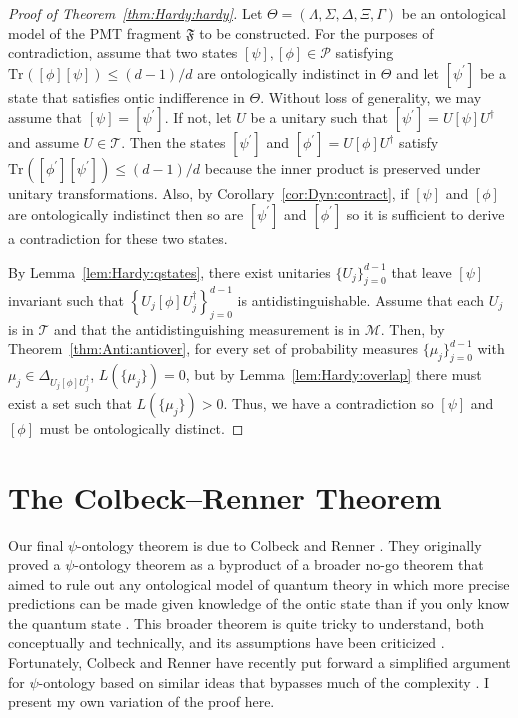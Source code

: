 \documentclass[DIV=calc,fontsize=12pt]{scrartcl} %
\theoremstyle{definition}
\theoremstyle{plain}
\newcommand{\Proj}[1]{\ensuremath{\left [ #1 \right ]}}
\newcommand{\Tr}[2][]{\ensuremath{\text{Tr}_{#1} \left ( #2 \right )}}
\begin{document}
\begin{proof}[Proof of Theorem~\ref{thm:Hardy:hardy}]
Let $\Theta = (\Lambda, \Sigma, \Delta, \Xi, \Gamma)$ be an ontological
model of the PMT fragment $\mathfrak{F}$ to be constructed.  For the
purposes of contradiction, assume that two states $\Proj{\psi},
\Proj{\phi} \in \mathcal{P}$ satisfying $\Tr{\Proj{\phi}\Proj{\psi}}
\leq (d-1)/d$ are ontologically indistinct in $\Theta$ and let
$\Proj{\psi^{\prime}}$ be a state that satisfies ontic indifference
in $\Theta$.  Without loss of generality, we may assume that
$\Proj{\psi} = \Proj{\psi^{\prime}}$.  If not, let $U$ be a unitary
such that $\Proj{\psi^{\prime}} = U \Proj{\psi} U^{\dagger}$ and
assume $U \in \mathcal{T}$.  Then the states $\Proj{\psi^{\prime}}$
and $\Proj{\phi^{\prime}} = U \Proj{\phi} U^{\dagger}$ satisfy
$\Tr{\Proj{\phi^{\prime}}\Proj{\psi^{\prime}}} \leq (d-1)/d$ because
the inner product is preserved under unitary transformations.  Also,
by Corollary~\ref{cor:Dyn:contract}, if $\Proj{\psi}$ and
$\Proj{\phi}$ are ontologically indistinct then so are
$\Proj{\psi^{\prime}}$ and $\Proj{\phi^{\prime}}$ so it is
sufficient to derive a contradiction for these two states.

By Lemma~\ref{lem:Hardy:qstates}, there exist unitaries
$\{U_j\}_{j=0}^{d-1}$ that leave $\Proj{\psi}$ invariant such that
$\left \{ U_j \Proj{\phi}U_j^{\dagger} \right \}_{j=0}^{d-1}$ is
antidistinguishable.  Assume that each $U_j$ is in $\mathcal{T}$ and
that the antidistinguishing measurement is in $\mathcal{M}$.  Then,
by Theorem~\ref{thm:Anti:antiover}, for every set of probability
measures $\{\mu_j\}_{j=0}^{d-1}$ with $\mu_j \in \Delta_{U_j
\Proj{\phi}U_j^{\dagger}}$, $L(\{\mu_j\}) = 0$, but by
Lemma~\ref{lem:Hardy:overlap} there must exist a set such that
$L(\{\mu_j\}) > 0$.  Thus, we have a contradiction so $\Proj{\psi}$
and $\Proj{\phi}$ must be ontologically distinct.
\end{proof}

\section{The Colbeck--Renner Theorem}

\label{CR}

Our final $\psi$-ontology theorem is due to Colbeck and Renner
\cite{Colbeck2013a}.  They originally proved a $\psi$-ontology theorem
as a byproduct of a broader no-go theorem that aimed to rule out any
ontological model of quantum theory in which more precise predictions
can be made given knowledge of the ontic state than if you only know
the quantum state \cite{Colbeck2011, Colbeck2012a, Colbeck2012}.  This
broader theorem is quite tricky to understand, both conceptually and
technically, and its assumptions have been criticized
\cite{Ghirardi2013, Ghirardi2013a, Ghirardi2013b}.  Fortunately,
Colbeck and Renner have recently put forward a simplified argument for
$\psi$-ontology based on similar ideas that bypasses much of the
complexity \cite{Colbeck2013a}.  I present my own variation of the
proof here.
\end{document}
